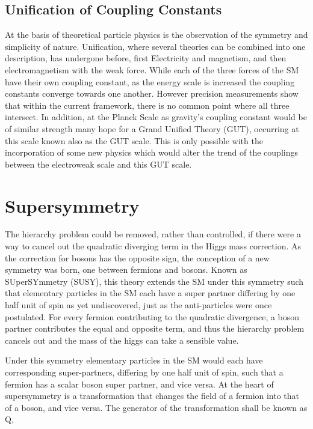 \subsection{Unification of Coupling Constants}

At the basis of theoretical particle physics is the observation of the symmetry and simplicity of nature. Unification, where several theories can be combined into one description,  has undergone before, first Electricity and magnetism, and then electromagnetism with the weak force. While each of the three forces of the SM have their own coupling constant, as the energy scale is increased the coupling constants converge towards one another. However precision measurements show that within the current framework,  there is no common point where all three intersect. In addition, at the Planck Scale as gravity's coupling constant would be of similar strength many hope for a Grand Unified Theory (GUT),  occurring at this scale known also as the GUT scale. This is only possible with the incorporation of some new physics which would alter the trend of the couplings between the electroweak scale and this GUT scale. 


\section{Supersymmetry}

The hierarchy problem could be removed, rather than controlled, if there were a way to cancel out the quadratic diverging term in the Higgs mass correction. As the correction for bosons has the opposite sign, the conception of a new symmetry was born, one between fermions and bosons. Known as SUperSYmmetry (SUSY), this theory extends the SM under this symmetry such that elementary particles in the SM each have a super partner differing by one half unit of spin as yet undiscovered, just as the anti-particles were once postulated. For every fermion contributing to the quadratic divergence, a boson partner contributes the equal and opposite term, and thus the hierarchy problem cancels out and the mass of the higgs can take a sensible value.

Under this symmetry elementary particles in the SM would each have corresponding super-partners, differing by one half unit of spin, such that a fermion has a scalar boson super partner, and vice versa. At the heart of supersymmetry is a transformation that changes the field of a fermion into that of a boson, and vice versa. The generator of the transformation shall be known as Q,

